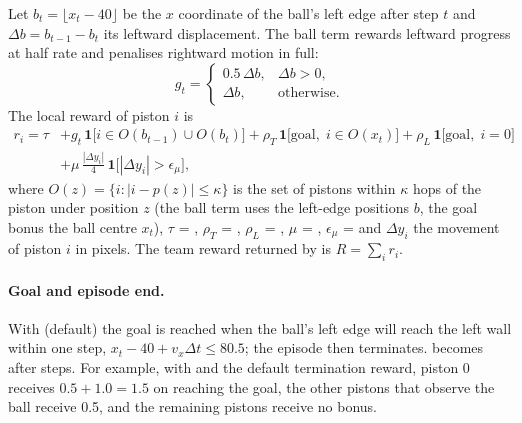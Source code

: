 Let $b_t = \lfloor x_t - 40 \rfloor$ be the $x$ coordinate of the ball's left
edge after step $t$ and $\Delta b = b_{t-1} - b_t$ its leftward displacement.
The ball term rewards leftward progress at half rate and penalises rightward
motion in full:
\begin{equation}
  g_t =
  \begin{cases}
    0.5\,\Delta b, & \Delta b > 0,\\
    \Delta b, & \text{otherwise.}
  \end{cases}
\end{equation}
The local reward of piston $i$ is
\begin{equation}
  \begin{split}
  r_i = \tau
      &+ g_t\, \mathbf{1}\bigl[i \in O(b_{t-1}) \cup O(b_t)\bigr]
       + \rho_T\, \mathbf{1}\bigl[\text{goal},\; i \in O(x_t)\bigr]
       + \rho_L\, \mathbf{1}\bigl[\text{goal},\; i = 0\bigr] \\
      &+ \mu\, \frac{|\Delta y_i|}{4}\, \mathbf{1}\bigl[|\Delta y_i| > \epsilon_\mu\bigr],
  \end{split}
  \label{eq:pistonball-reward}
\end{equation}
where $O(z) = \{ i : |i - p(z)| \le \kappa \}$ is the set of pistons within
$\kappa$ hops of the piston under position $z$ (the ball term uses the left-edge
positions $b$, the goal bonus the ball centre $x_t$), $\tau$ =
, $\rho_T$ = , $\rho_L$ =
, $\mu$ = ,
$\epsilon_\mu$ =  and $\Delta y_i$ the
movement of piston $i$ in pixels. The team reward returned by  is
$R = \sum_i r_i$.

\paragraph{Goal and episode end.} With 
(default) the goal is reached when the ball's left edge will reach the left wall
within one step, $x_t - 40 + v_x \Delta t \le 80.5$; the episode then
terminates.  becomes  after 
steps. For example, with  and the default
termination reward, piston 0 receives $0.5 + 1.0 = 1.5$ on reaching the goal,
the other pistons that observe the ball receive 0.5, and the remaining pistons
receive no bonus.

